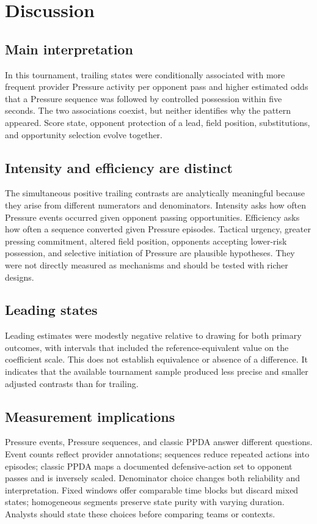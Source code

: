\section{Discussion}

\subsection{Main interpretation}
In this tournament, trailing states were conditionally associated with more frequent provider Pressure activity per opponent pass and higher estimated odds that a Pressure sequence was followed by controlled possession within five seconds. The two associations coexist, but neither identifies why the pattern appeared. Score state, opponent protection of a lead, field position, substitutions, and opportunity selection evolve together.

\subsection{Intensity and efficiency are distinct}
The simultaneous positive trailing contrasts are analytically meaningful because they arise from different numerators and denominators. Intensity asks how often Pressure events occurred given opponent passing opportunities. Efficiency asks how often a sequence converted given Pressure episodes. Tactical urgency, greater pressing commitment, altered field position, opponents accepting lower-risk possession, and selective initiation of Pressure are plausible hypotheses. They were not directly measured as mechanisms and should be tested with richer designs.

\subsection{Leading states}
Leading estimates were modestly negative relative to drawing for both primary outcomes, with intervals that included the reference-equivalent value on the coefficient scale. This does not establish equivalence or absence of a difference. It indicates that the available tournament sample produced less precise and smaller adjusted contrasts than for trailing.

\subsection{Measurement implications}
Pressure events, Pressure sequences, and classic PPDA answer different questions. Event counts reflect provider annotations; sequences reduce repeated actions into episodes; classic PPDA maps a documented defensive-action set to opponent passes and is inversely scaled. Denominator choice changes both reliability and interpretation. Fixed windows offer comparable time blocks but discard mixed states; homogeneous segments preserve state purity with varying duration. Analysts should state these choices before comparing teams or contexts.

